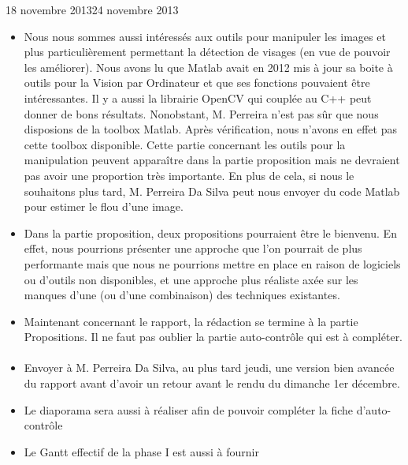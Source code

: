 \documentclass[11pt, french]{report-rd-info}
\begin{document}
\begin{fichesuivi}{18 novembre 2013}{24 novembre 2013}
\begin{echange}
\begin{itemize}
			\item Nous nous sommes aussi intéressés aux outils pour manipuler les images et plus particulièrement permettant la détection de visages (en vue de pouvoir les améliorer). Nous avons lu que Matlab avait en 2012 mis à jour sa boite à outils pour la Vision par Ordinateur et que ses fonctions pouvaient être intéressantes. Il y a aussi la librairie OpenCV qui couplée au C++ peut donner de bons résultats. Nonobstant, M. Perreira n'est pas sûr que nous disposions de la toolbox Matlab. Après vérification, nous n'avons en effet pas cette toolbox disponible. Cette partie concernant les outils pour la manipulation peuvent apparaître dans la partie proposition mais ne devraient pas avoir une proportion très importante. En plus de cela, si nous le souhaitons plus tard, M. Perreira Da Silva peut nous envoyer du code Matlab pour estimer le flou d'une image.
			\item Dans la partie proposition, deux propositions pourraient être le bienvenu. En effet, nous pourrions présenter une approche que l'on pourrait de plus performante mais que nous ne pourrions mettre en place en raison de logiciels ou d'outils non disponibles, et une approche plus réaliste axée sur les manques d'une (ou d'une combinaison) des techniques existantes. 					\item Maintenant concernant le rapport, la rédaction se termine à la partie Propositions. Il ne faut pas oublier la partie auto-contrôle qui est à compléter.
		\end{itemize}
	\end{echange}		
		
\paragraph{}
	\begin{planification}
		\begin{itemize}
			\item Envoyer à M. Perreira Da Silva, au plus tard jeudi, une version bien avancée du rapport avant d'avoir un retour avant le rendu du dimanche 1er décembre.
			\item Le diaporama sera aussi à réaliser afin de pouvoir compléter la fiche d'auto-contrôle
			\item Le Gantt effectif de la phase I est aussi à fournir
		\end{itemize}
	\end{planification}
\end{fichesuivi}
\end{document}
